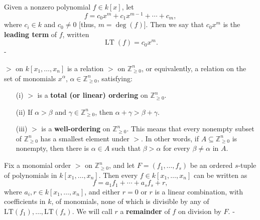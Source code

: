 \begin{definition}\label{MonomialOrder.leadingTerm}
  \leanok
  Given a nonzero polynomial \( f \in k[x] \), let
\[
f = c_0 x^m + c_1 x^{m-1} + \cdots + c_m,
\]
where \( c_i \in k \) and \( c_0 \neq 0 \) [thus, \( m = \deg(f) \)]. Then we say that \( c_0 x^m \) is the \textbf{leading term} of \( f \), written
\[
\operatorname{LT}(f) = c_0 x^m.
\]
-
\end{definition}

\begin{definition}\label{MonomialOrder}
  \leanok
  \( > \) on \( k[x_1, \ldots, x_n] \) is a relation \( > \) on \( \mathbb{Z}_{\geq 0}^n \), or equivalently, a relation on the set of monomials \( x^\alpha \), \( \alpha \in \mathbb{Z}_{\geq 0}^n \), satisfying:

  \begin{enumerate}
      \item[(i)] \( > \) is a \textbf{total (or linear) ordering} on \( \mathbb{Z}_{\geq 0}^n \).

      \item[(ii)] If \( \alpha > \beta \) and \( \gamma \in \mathbb{Z}_{\geq 0}^n \), then \( \alpha + \gamma > \beta + \gamma \).

      \item[(iii)] \( > \) is a \textbf{well-ordering} on \( \mathbb{Z}_{\geq 0}^n \). This means that every nonempty subset of \( \mathbb{Z}_{\geq 0}^n \) has a smallest element under \( > \). In other words, if \( A \subseteq \mathbb{Z}_{\geq 0}^n \) is nonempty, then there is \( \alpha \in A \) such that \( \beta > \alpha \) for every \( \beta \neq \alpha \) in \( A \).
  \end{enumerate}
\end{definition}

\begin{definition}\label{MonomialOrder.IsRemainder}
  \leanok
  Fix a monomial order \(>\) on \(\mathbb{Z}_{\geq 0}^n\), and let
\(F = (f_1, \ldots, f_s)\) be an ordered \(s\)-tuple of polynomials in \(k[x_1, \ldots, x_n]\).
Then every \(f \in k[x_1, \ldots, x_n]\) can be written as
\[
f = a_1 f_1 + \cdots + a_s f_s + r,
\]
where \(a_i, r \in k[x_1, \ldots, x_n]\), and either \(r = 0\) or \(r\) is a linear combination, with coefficients in \(k\), of monomials, none of which is divisible by any of \(\mathrm{LT}(f_1), \ldots, \mathrm{LT}(f_s)\).
We will call \(r\) a \textbf{remainder} of \(f\) on division by \(F\).
-
\end{definition}

